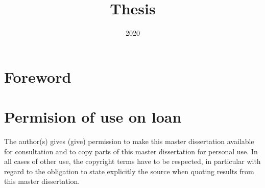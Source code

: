 \documentclass{book}
\title{Thesis}
\date{2020}
\begin{document}














\frontmatter


% 




\newpage
\listoftodos
\newpage




\section*{Foreword}

\section*{Permision of use on loan }
The author(s) gives (give) permission to make this master dissertation available for consultation and to copy parts of this master dissertation for personal use. In all cases of other use, the copyright terms have to be respected, in particular with regard to the obligation to state explicitly the source when quoting results from this master dissertation.
\end{document}
